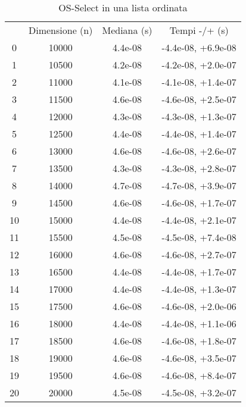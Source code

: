 \begin{table}
\centering
\caption{OS-Select in una lista ordinata}
\label{OS-Select in una lista ordinata}
\begin{adjustbox}{width=1\textwidth/2}
\begin{tabular}{|c|c|c|c|}
\hline
 & Dimensione (n) & Mediana (s) & Tempi -/+ (s) \\
0 & 10000 & 4.4e-08 & -4.4e-08, +6.9e-08 \\
\cline{1-4}
1 & 10500 & 4.2e-08 & -4.2e-08, +2.0e-07 \\
\cline{1-4}
2 & 11000 & 4.1e-08 & -4.1e-08, +1.4e-07 \\
\cline{1-4}
3 & 11500 & 4.6e-08 & -4.6e-08, +2.5e-07 \\
\cline{1-4}
4 & 12000 & 4.3e-08 & -4.3e-08, +1.3e-07 \\
\cline{1-4}
5 & 12500 & 4.4e-08 & -4.4e-08, +1.4e-07 \\
\cline{1-4}
6 & 13000 & 4.6e-08 & -4.6e-08, +2.6e-07 \\
\cline{1-4}
7 & 13500 & 4.3e-08 & -4.3e-08, +2.8e-07 \\
\cline{1-4}
8 & 14000 & 4.7e-08 & -4.7e-08, +3.9e-07 \\
\cline{1-4}
9 & 14500 & 4.6e-08 & -4.6e-08, +1.7e-07 \\
\cline{1-4}
10 & 15000 & 4.4e-08 & -4.4e-08, +2.1e-07 \\
\cline{1-4}
11 & 15500 & 4.5e-08 & -4.5e-08, +7.4e-08 \\
\cline{1-4}
12 & 16000 & 4.6e-08 & -4.6e-08, +2.7e-07 \\
\cline{1-4}
13 & 16500 & 4.4e-08 & -4.4e-08, +1.7e-07 \\
\cline{1-4}
14 & 17000 & 4.4e-08 & -4.4e-08, +1.3e-07 \\
\cline{1-4}
15 & 17500 & 4.6e-08 & -4.6e-08, +2.0e-06 \\
\cline{1-4}
16 & 18000 & 4.4e-08 & -4.4e-08, +1.1e-06 \\
\cline{1-4}
17 & 18500 & 4.6e-08 & -4.6e-08, +1.8e-07 \\
\cline{1-4}
18 & 19000 & 4.6e-08 & -4.6e-08, +3.5e-07 \\
\cline{1-4}
19 & 19500 & 4.6e-08 & -4.6e-08, +8.4e-07 \\
\cline{1-4}
20 & 20000 & 4.5e-08 & -4.5e-08, +3.2e-07 \\
\cline{1-4}
\end{tabular}
\end{adjustbox}
\end{table}

